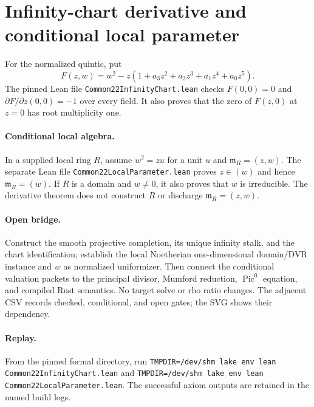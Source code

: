\documentclass[10pt]{article}
\begin{document}
\section*{Infinity-chart derivative and conditional local parameter}
For the normalized quintic, put
\[
F(z,w)=w^2-z(1+a_3z^2+a_2z^3+a_1z^4+a_0z^5).
\]
The pinned Lean file \texttt{Common22InfinityChart.lean} checks
$F(0,0)=0$ and $\partial F/\partial z(0,0)=-1$ over every field. It also
proves that the zero of $F(z,0)$ at $z=0$ has root multiplicity one.

\paragraph{Conditional local algebra.} In a supplied local ring $R$, assume
$w^2=zu$ for a unit $u$ and $\mathfrak m_R=(z,w)$. The separate Lean file
\texttt{Common22LocalParameter.lean} proves $z\in(w)$ and hence
$\mathfrak m_R=(w)$. If $R$ is a domain and $w\ne0$, it also proves that $w$
is irreducible. The derivative theorem does not construct $R$ or discharge
$\mathfrak m_R=(z,w)$.

\paragraph{Open bridge.} Construct the smooth projective completion, its
unique infinity stalk, and the chart identification; establish the local
Noetherian one-dimensional domain/DVR instance and $w$ as normalized
uniformizer. Then connect the conditional valuation packets to the principal
divisor, Mumford reduction, $\operatorname{Pic}^0$ equation, and compiled Rust
semantics. No target solve or rho ratio changes. The adjacent CSV records
checked, conditional, and open gates; the SVG shows their dependency.

\paragraph{Replay.} From the pinned formal directory, run
\texttt{TMPDIR=/dev/shm lake env lean Common22InfinityChart.lean} and
\texttt{TMPDIR=/dev/shm lake env lean Common22LocalParameter.lean}. The
successful axiom outputs are retained in the named build logs.
\end{document}
